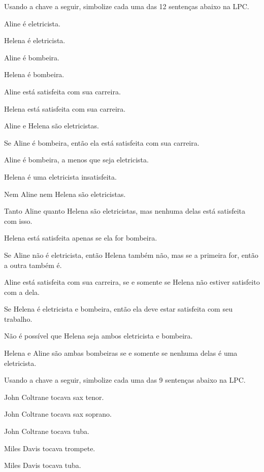 \problempart Usando a chave a seguir, simbolize cada uma das 12 sentenças abaixo na LPC.\label{pr.avacareer}
	\begin{ekey}
		\item[E_1] Aline é eletricista.
		\item[E_2] Helena é eletricista.
		\item[B_1] Aline é bombeira.
		\item[B_2] Helena é bombeira.
		\item[S_1] Aline está satisfeita com sua carreira.
		\item[S_2] Helena está satisfeita com sua carreira.
	\end{ekey}
	\begin{earg}
		\item Aline e Helena são eletricistas.
		\item Se Aline é bombeira, então ela está satisfeita com sua carreira.
		\item Aline é bombeira, a menos que seja eletricista.
		\item Helena é uma eletricista insatisfeita.
		\item Nem Aline nem Helena são eletricistas.
		\item Tanto Aline quanto Helena são eletricistas, mas nenhuma delas está satisfeita com isso.
		\item Helena está satisfeita apenas se ela for bombeira.
		\item Se Aline não é eletricista, então Helena também não, mas se a primeira for, então a outra também é.
		\item Aline está satisfeita com sua carreira, se e somente se Helena não estiver satisfeito com a dela.
		\item Se Helena é eletricista e bombeira, então ela deve estar satisfeita com seu trabalho.
		\item Não é possível que Helena seja ambos eletricista e bombeira.
		\item Helena e Aline são ambas bombeiras se e somente se nenhuma delas é uma eletricista.
	\end{earg}

\problempart
Usando a chave a seguir, simbolize cada uma das 9 sentenças abaixo na LPC.
\label{pr.jazzinstruments}
\begin{ekey}
	\item[J_1] John Coltrane tocava sax tenor.
	\item[J_2] John Coltrane tocava sax soprano.
	\item[J_3] John Coltrane tocava tuba.
	\item[M_1] Miles Davis tocava trompete.
	\item[M_2] Miles Davis tocava tuba.
\end{ekey}

